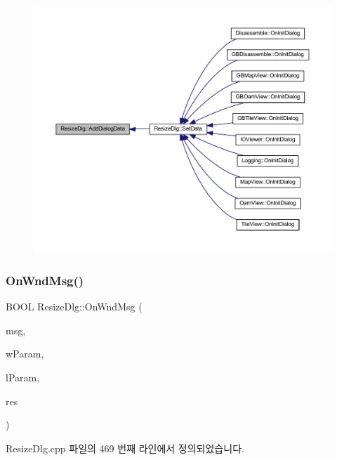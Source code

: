 \begin{figure}[H]
\begin{center}
\leavevmode
\includegraphics[width=350pt]{class_resize_dlg_a5657ce3f83f261aceaf138cd1c69f0fc_icgraph}
\end{center}
\end{figure}
\mbox{\label{class_resize_dlg_a9d3f421da2488db11224b0508be654fd}} 
\subsubsection{\texorpdfstring{On\+Wnd\+Msg()}{OnWndMsg()}}
{\footnotesize\ttfamily B\+O\+OL Resize\+Dlg\+::\+On\+Wnd\+Msg (\begin{DoxyParamCaption}\item[{U\+I\+NT}]{msg,  }\item[{W\+P\+A\+R\+AM}]{w\+Param,  }\item[{L\+P\+A\+R\+AM}]{l\+Param,  }\item[{L\+R\+E\+S\+U\+LT $\ast$}]{res }\end{DoxyParamCaption})\hspace{0.3cm}{\ttfamily [virtual]}}



Resize\+Dlg.\+cpp 파일의 469 번째 라인에서 정의되었습니다.


